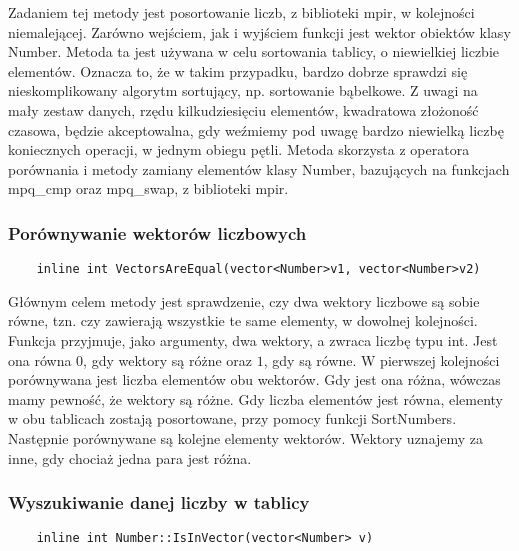 \documentclass[oneside,a4paper]{book}
\begin{document}
	Zadaniem tej metody jest posortowanie liczb, z biblioteki mpir, w kolejności niemalejącej. Zarówno wejściem, jak i wyjściem funkcji jest wektor obiektów klasy Number. Metoda ta jest używana w celu sortowania tablicy, o niewielkiej liczbie elementów. Oznacza to, że w takim przypadku, bardzo dobrze sprawdzi się nieskomplikowany algorytm sortujący, np. sortowanie bąbelkowe. Z uwagi na mały zestaw danych, rzędu kilkudziesięciu elementów, kwadratowa złożoność czasowa, będzie akceptowalna, gdy weźmiemy pod uwagę bardzo niewielką liczbę koniecznych operacji, w jednym obiegu pętli. Metoda skorzysta z operatora porównania i metody zamiany elementów klasy Number, bazujących na funkcjach mpq\_cmp oraz mpq\_swap, z biblioteki mpir.
	\\
	
	\subsubsection{Porównywanie wektorów liczbowych}
	\begin{lstlisting}
	inline int VectorsAreEqual(vector<Number>v1, vector<Number>v2)
	\end{lstlisting}
	
	Głównym celem metody jest sprawdzenie, czy dwa wektory liczbowe są sobie równe, tzn. czy zawierają wszystkie te same elementy, w dowolnej kolejności. Funkcja przyjmuje, jako argumenty, dwa wektory, a zwraca liczbę typu int. Jest ona równa $0$, gdy wektory są różne oraz $1$, gdy są równe. W pierwszej kolejności porównywana jest liczba elementów obu wektorów. Gdy jest ona różna, wówczas mamy pewność, że wektory są różne. Gdy liczba elementów jest równa, elementy w obu tablicach zostają posortowane, przy pomocy funkcji SortNumbers. Następnie porównywane są kolejne elementy wektorów. Wektory uznajemy za inne, gdy chociaż jedna para jest różna.
	\\
	
	\subsubsection{Wyszukiwanie danej liczby w tablicy}
	\begin{lstlisting}
	inline int Number::IsInVector(vector<Number> v)
	\end{lstlisting}
	
\end{document}
